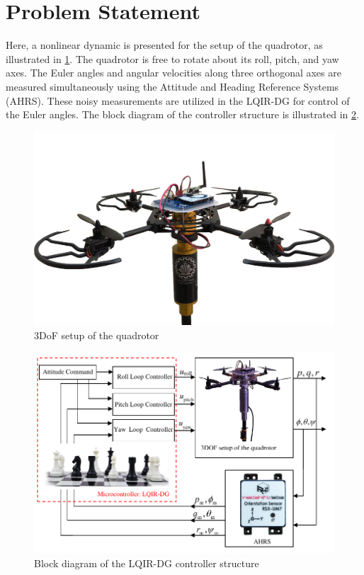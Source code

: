 \documentclass[conference]{IEEEtran}
\begin{document}
\section{Problem Statement}\label{sec:problem_statement}
\noindent Here, a nonlinear dynamic is presented for the setup of the quadrotor, as illustrated in \figurename{\ref{quadlab}}.
The quadrotor is free to rotate about its roll, pitch, and yaw axes. The Euler angles and angular velocities along three orthogonal axes are measured simultaneously using the Attitude and Heading Reference Systems (AHRS). These noisy measurements are utilized in the LQIR-DG for control of the Euler angles.
The block diagram of the controller structure is illustrated in \figurename{\ref{block_diagram}}.
\vspace{-1cm}
\begin{figure}[!h]
	\vspace{0.1cm}
	\includegraphics[width=\linewidth]{../Figures/introduction/3DOFQuad.png}
	\centering
	\caption{3DoF setup of the quadrotor %
	}
	\label{quadlab}
\end{figure}
\begin{figure}[!h]
	\includegraphics[width=\linewidth]{../Figures/introduction/schematic.pdf}
	\centering
	\caption{Block diagram of the LQIR-DG controller structure}
	\label{block_diagram}
\end{figure}
\end{document}
